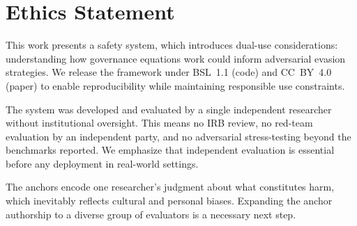 \documentclass[11pt]{article}
\begin{document}
\section*{Ethics Statement}

This work presents a safety system, which introduces dual-use considerations: understanding how governance equations work could inform adversarial evasion strategies.
We release the framework under BSL~1.1 (code) and CC~BY~4.0 (paper) to enable reproducibility while maintaining responsible use constraints.

The system was developed and evaluated by a single independent researcher without institutional oversight.
This means no IRB review, no red-team evaluation by an independent party, and no adversarial stress-testing beyond the benchmarks reported.
We emphasize that independent evaluation is essential before any deployment in real-world settings.

The anchors encode one researcher's judgment about what constitutes harm, which inevitably reflects cultural and personal biases.
Expanding the anchor authorship to a diverse group of evaluators is a necessary next step.

\end{document}

